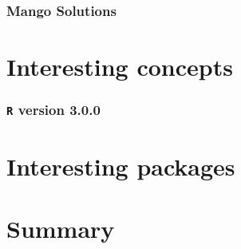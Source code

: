 \documentclass{beamer}
\begin{document}
\begin{frame}
  \frametitle{Mango Solutions}
\end{frame}

\section{Interesting concepts}
\begin{frame}
  \frametitle{\texttt{R} version 3.0.0}
\end{frame}

\section{Interesting packages}

\section*{Summary}
%
%
%
%
%
\end{document}
